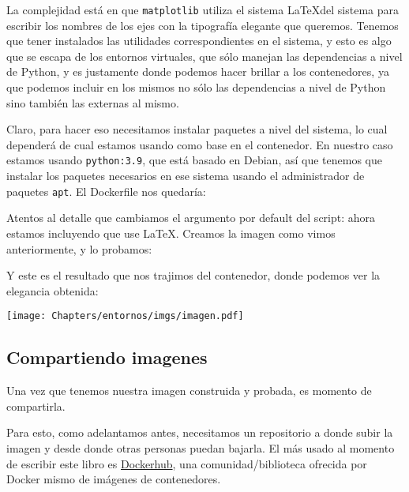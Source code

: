 La complejidad está en que \texttt{matplotlib} utiliza el sistema \LaTeX del sistema para escribir los nombres de los ejes con la tipografía elegante que queremos. Tenemos que tener instalados las utilidades correspondientes en el sistema, y esto es algo que se escapa de los entornos virtuales, que sólo manejan las dependencias a nivel de Python, y es justamente donde podemos hacer brillar a los contenedores, ya que podemos incluir en los mismos no sólo las dependencias a nivel de Python sino también las externas al mismo.

Claro, para hacer eso necesitamos instalar paquetes a nivel del sistema, lo cual dependerá de cual estamos usando como base en el contenedor. En nuestro caso estamos usando \texttt{python:3.9}, que está basado en Debian, así que tenemos que instalar los paquetes necesarios en ese sistema usando el administrador de paquetes \texttt{apt}. El Dockerfile nos quedaría:


Atentos al detalle que cambiamos el argumento por default del script: ahora estamos incluyendo que use \LaTeX. Creamos la imagen como vimos anteriormente, y lo probamos:


Y este es el resultado que nos trajimos del contenedor, donde podemos ver la elegancia obtenida:

\begin{center}
    \texttt{[image: Chapters/entornos/imgs/imagen.pdf]}
\end{center}


\subsection{Compartiendo imagenes}

Una vez que tenemos nuestra imagen construida y probada, es momento de compartirla. 

Para esto, como adelantamos antes, necesitamos un repositorio a donde subir la imagen y desde donde otras personas puedan bajarla. El más usado al momento de escribir este libro es \href{https://hub.docker.com/search?q=&type=image}{Dockerhub}, una comunidad/biblioteca ofrecida por Docker mismo de imágenes de contenedores.


